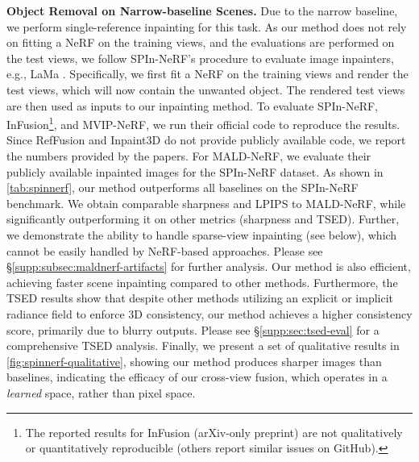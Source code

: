 \noindent\textbf{Object Removal on Narrow-baseline Scenes.}
Due to the narrow baseline, we perform single-reference inpainting for this task. As our method does not rely on fitting a NeRF on the training views, and the evaluations are performed on the test views, we follow SPIn-NeRF's \cite{spinnerf} procedure to evaluate image inpainters, e.g., LaMa \cite{lama}. Specifically, we first fit a NeRF on the training views and render the test views, which will now contain the unwanted object. The rendered test views are then used as inputs to our inpainting method.
To evaluate SPIn-NeRF, InFusion\footnote{The reported results for InFusion (arXiv-only preprint) are not qualitatively or quantitatively reproducible (others report similar issues on GitHub).}, and MVIP-NeRF, we run their official code to reproduce the results.
Since RefFusion and Inpaint3D do not provide publicly available code, we report the numbers provided by the papers.
For MALD-NeRF, we evaluate their publicly available inpainted images for the SPIn-NeRF dataset.
As shown in
\cref{tab:spinnerf},
our method outperforms all baselines on the SPIn-NeRF benchmark.
We obtain comparable sharpness and LPIPS to MALD-NeRF, while significantly outperforming it on other metrics
(sharpness and TSED). Further, 
we demonstrate the ability to handle sparse-view inpainting (see below), which cannot be easily handled by NeRF-based approaches.
Please see \S\ref{supp:subsec:maldnerf-artifacts} for further analysis.
Our method is also efficient, achieving faster scene inpainting compared to other methods.
Furthermore, 
the TSED results
show that despite other methods utilizing an explicit or implicit radiance field to enforce 3D consistency, our method achieves a higher consistency score, primarily due to blurry outputs. Please see \S\ref{supp:sec:tsed-eval} for a comprehensive TSED analysis. 
Finally, we present a set of qualitative results in \cref{fig:spinnerf-qualitative}, 
showing
our method produces sharper images 
than baselines,
indicating the efficacy of our cross-view fusion, which operates in a \textit{learned} space, rather than pixel space.

